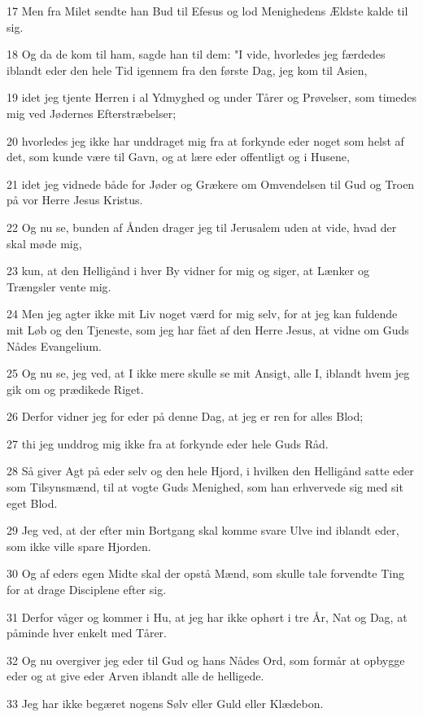 \par 17 Men fra Milet sendte han Bud til Efesus og lod Menighedens Ældste kalde til sig.
\par 18 Og da de kom til ham, sagde han til dem: "I vide, hvorledes jeg færdedes iblandt eder den hele Tid igennem fra den første Dag, jeg kom til Asien,
\par 19 idet jeg tjente Herren i al Ydmyghed og under Tårer og Prøvelser, som timedes mig ved Jødernes Efterstræbelser;
\par 20 hvorledes jeg ikke har unddraget mig fra at forkynde eder noget som helst af det, som kunde være til Gavn, og at lære eder offentligt og i Husene,
\par 21 idet jeg vidnede både for Jøder og Grækere om Omvendelsen til Gud og Troen på vor Herre Jesus Kristus.
\par 22 Og nu se, bunden af Ånden drager jeg til Jerusalem uden at vide, hvad der skal møde mig,
\par 23 kun, at den Helligånd i hver By vidner for mig og siger, at Lænker og Trængsler vente mig.
\par 24 Men jeg agter ikke mit Liv noget værd for mig selv, for at jeg kan fuldende mit Løb og den Tjeneste, som jeg har fået af den Herre Jesus, at vidne om Guds Nådes Evangelium.
\par 25 Og nu se, jeg ved, at I ikke mere skulle se mit Ansigt, alle I, iblandt hvem jeg gik om og prædikede Riget.
\par 26 Derfor vidner jeg for eder på denne Dag, at jeg er ren for alles Blod;
\par 27 thi jeg unddrog mig ikke fra at forkynde eder hele Guds Råd.
\par 28 Så giver Agt på eder selv og den hele Hjord, i hvilken den Helligånd satte eder som Tilsynsmænd, til at vogte Guds Menighed, som han erhvervede sig med sit eget Blod.
\par 29 Jeg ved, at der efter min Bortgang skal komme svare Ulve ind iblandt eder, som ikke ville spare Hjorden.
\par 30 Og af eders egen Midte skal der opstå Mænd, som skulle tale forvendte Ting for at drage Disciplene efter sig.
\par 31 Derfor våger og kommer i Hu, at jeg har ikke ophørt i tre År, Nat og Dag, at påminde hver enkelt med Tårer.
\par 32 Og nu overgiver jeg eder til Gud og hans Nådes Ord, som formår at opbygge eder og at give eder Arven iblandt alle de helligede.
\par 33 Jeg har ikke begæret nogens Sølv eller Guld eller Klædebon.
